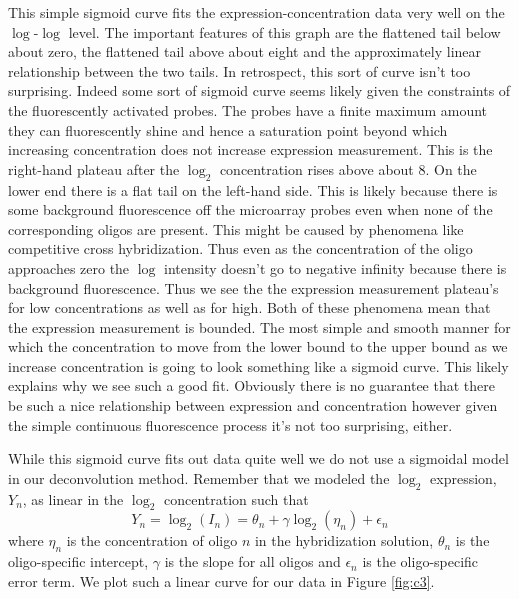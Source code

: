 \documentclass[reqno,12pt,oneside]{report}\usepackage[]{graphicx}\usepackage[]{color}
\theoremstyle{plain}
\theoremstyle{definition}
\theoremstyle{remark}
\numberwithin{theorem}{chapter}     %
\begin{document}
This simple sigmoid curve fits the expression-concentration data very well on the $\log$-$\log$ level. The important features of this graph are the flattened tail below about zero, the flattened tail above about eight and the approximately linear relationship between the two tails. In retrospect, this sort of curve isn't too surprising. Indeed some sort of sigmoid curve seems likely given the constraints of the fluorescently activated probes. The probes have a finite maximum amount they can fluorescently shine and hence a saturation point beyond which increasing concentration does not increase expression measurement. This is the right-hand plateau after the $\log_2$ concentration rises above about $8$. On the lower end there is a flat tail on the left-hand side. This is likely because there is some background fluorescence off the microarray probes even when none of the corresponding oligos are present. This might be caused by phenomena like competitive cross hybridization. Thus even as the concentration of the oligo approaches zero the $\log$ intensity doesn't go to negative infinity because there is background fluorescence. Thus we see the the expression measurement plateau's for low concentrations as well as for high. Both of these phenomena mean that the expression measurement is bounded. The most simple and smooth manner for which the concentration to move from the lower bound to the upper bound as we increase concentration is going to look something like a sigmoid curve. This likely explains why we see such a good fit. Obviously there is no guarantee that there be such a nice relationship between expression and concentration however given the simple continuous fluorescence process it's not too surprising, either.


While this sigmoid curve fits out data quite well we do not use a sigmoidal model in our deconvolution method. Remember that we modeled the $\log_2$ expression, $Y_n$, as linear in the $\log_2$ concentration such that 
\[
Y_n =\log_2(I_n) = \theta_n + \gamma\log_2\left(\eta_n\right) + \epsilon_n
\]
where $\eta_n$ is the concentration of oligo $n$ in the hybridization solution, $\theta_n$ is the oligo-specific intercept, $\gamma$ is the slope for all oligos and $\epsilon_n$ is the oligo-specific error term. We plot such a linear curve for our data in Figure \ref{fig:c3}.
\end{document}
